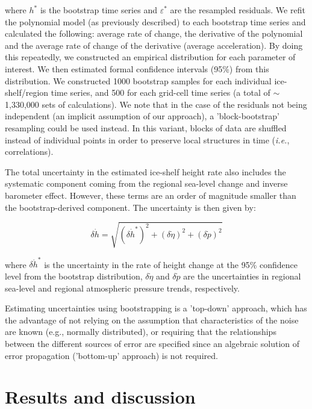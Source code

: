 \noindent
where $h^*$ is the bootstrap time series and $\varepsilon^*$ are the resampled residuals. We refit the polynomial model (as previously described) to each bootstrap time series and calculated the following: average rate of change, the derivative of the polynomial and the average rate of change of the derivative (average acceleration). By doing this repeatedly, we constructed an empirical distribution for each parameter of interest. We then estimated formal confidence intervals (95\%) from this distribution. We constructed 1000 bootstrap samples for each individual ice-shelf/region time series, and 500 for each grid-cell time series (a total of $\sim$1,330,000 sets of calculations). We note that in the case of the residuals not being independent (an implicit assumption of our approach), a 'block-bootstrap' resampling could be used instead. In this variant, blocks of data are shuffled instead of individual points in order to preserve local structures in time ({\it i.e.}, correlations).

The total uncertainty in the estimated ice-shelf height rate also includes the systematic component coming from the regional sea-level change and inverse barometer effect. However, these terms are an order of magnitude smaller than the bootstrap-derived component. The uncertainty is then given by:

\begin{equation}
  \delta \dot h = \sqrt{
    (\delta \dot h^*)^2 + (\delta \dot \eta)^2 + (\delta \dot p)^2
    }
  \label{c2e10}
\end{equation}

\noindent
where $\delta \dot h^*$ is the uncertainty in the rate of height change at the 95\% confidence level from the bootstrap distribution, $\delta \dot \eta$ and $\delta \dot p$ are the uncertainties in regional sea-level and regional atmospheric pressure trends, respectively.

Estimating uncertainties using bootstrapping is a 'top-down' approach, which has the advantage of not relying on the assumption that characteristics of the noise are known (e.g., normally distributed), or requiring that the relationships between the different sources of error are specified since an algebraic solution of error propagation ('bottom-up' approach) is not required.

\section{Results and discussion}

